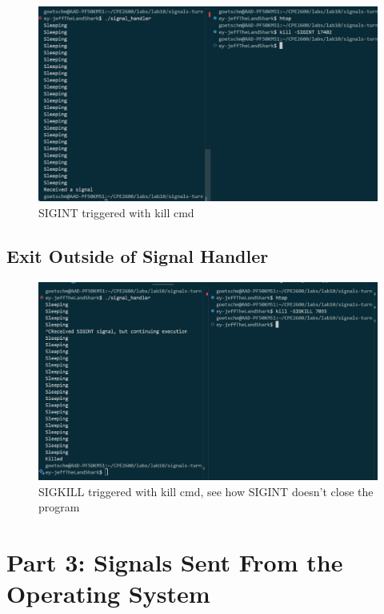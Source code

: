 \documentclass{assignment}
\begin{document}
\begin{figure}
    \centering
    \includegraphics[width=1\linewidth]{images/SIGINT_kill.png}
    \caption{SIGINT triggered with kill cmd}
\end{figure}

\subsection{Exit Outside of Signal Handler}

\begin{figure}
    \centering
    \includegraphics[width=1\linewidth]{images/SIGKILL.png}
    \caption{SIGKILL triggered with kill cmd, see how SIGINT doesn't close the program}
\end{figure}

\section{Part 3: Signals Sent From the Operating System}
\end{document}

